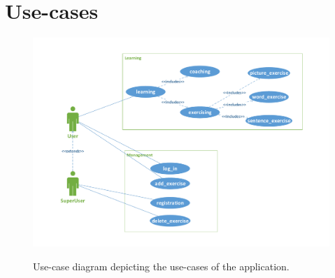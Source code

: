 \documentclass[a4paper]{article}
\begin{document}
	\section{Use-cases}
	\begin{figure}[htbp]
		\center
		\resizebox{160mm}{!} {
			\includegraphics{figures/use-case.pdf}
		}
		\caption{Use-case diagram depicting the use-cases of the application.}
		\label{fig:use-case}
	\end{figure}

	
\end{document}

